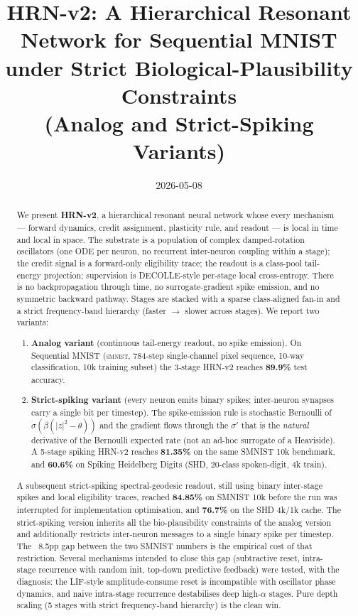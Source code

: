 \documentclass[11pt]{article}
\title{HRN-v2: A Hierarchical Resonant Network for Sequential MNIST \\
       under Strict Biological-Plausibility Constraints \\
       \large{(Analog and Strict-Spiking Variants)}}
\author{}
\date{2026-05-08}
\begin{document}
\maketitle

\begin{abstract}
We present \textbf{HRN-v2}, a hierarchical resonant neural network whose
every mechanism --- forward dynamics, credit assignment, plasticity
rule, and readout --- is local in time and local in space. The
substrate is a population of complex damped-rotation oscillators (one
ODE per neuron, no recurrent inter-neuron coupling within a stage);
the credit signal is a forward-only eligibility trace; the readout is
a class-pool tail-energy projection; supervision is DECOLLE-style
per-stage local cross-entropy. There is no backpropagation through
time, no surrogate-gradient spike emission, and no symmetric backward
pathway. Stages are stacked with a sparse class-aligned fan-in and a
strict frequency-band hierarchy (faster $\rightarrow$ slower across
stages). We report two variants:
\begin{enumerate}[itemsep=2pt]
\item \textbf{Analog variant} (continuous tail-energy readout, no
spike emission). On Sequential MNIST (\textsc{smnist}, 784-step
single-channel pixel sequence, 10-way classification, 10k training
subset) the 3-stage HRN-v2 reaches \textbf{89.9\%} test accuracy.
\item \textbf{Strict-spiking variant} (every neuron emits binary
spikes; inter-neuron synapses carry a single bit per timestep).
The spike-emission rule is stochastic Bernoulli of
$\sigma(\beta(|z|^2 - \theta))$ and the gradient flows through the
$\sigma'$ that is the \emph{natural} derivative of the Bernoulli
expected rate (not an ad-hoc surrogate of a Heaviside). A 5-stage
spiking HRN-v2 reaches \textbf{81.35\%} on the same SMNIST 10k
benchmark, and \textbf{60.6\%} on Spiking Heidelberg Digits (SHD,
20-class spoken-digit, 4k train).
\end{enumerate}
A subsequent strict-spiking spectral-geodesic readout, still using
binary inter-stage spikes and local eligibility traces, reached
\textbf{84.85\%} on SMNIST 10k before the run was interrupted for
implementation optimisation, and \textbf{76.7\%} on the SHD 4k/1k
cache.
The strict-spiking version inherits all the bio-plausibility
constraints of the analog version and additionally restricts
inter-neuron messages to a single binary spike per timestep. The
~8.5pp gap between the two SMNIST numbers is the empirical cost of
that restriction. Several mechanisms intended to close this gap
(subtractive reset, intra-stage recurrence with random init, top-down
predictive feedback) were tested, with the diagnosis: the LIF-style
amplitude-consume reset is incompatible with oscillator phase
dynamics, and naive intra-stage recurrence destabilises deep
high-$\alpha$ stages. Pure depth scaling (5 stages with strict
frequency-band hierarchy) is the clean win.
\end{abstract}
\end{document}
